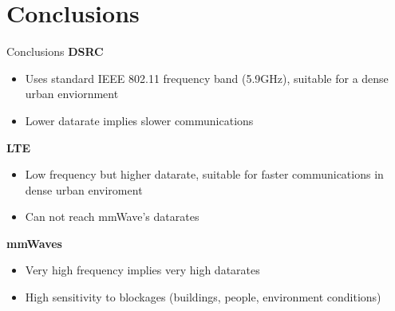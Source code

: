 \documentclass{beamer}
\begin{document}
	\section{Conclusions}
	\begin{frame}{Conclusions}
		\textbf{DSRC}
		\begin{itemize}
			\item Uses standard IEEE 802.11 frequency band (5.9GHz), suitable for a dense urban enviornment
			\item Lower datarate implies slower communications
		\end{itemize}
		\textbf{LTE}
		\begin{itemize}
			\item Low frequency but higher datarate, suitable for faster communications in dense urban enviroment
			\item Can not reach mmWave's datarates
		\end{itemize}
		\textbf{mmWaves}
		\begin{itemize}
			\item Very high frequency implies very high datarates
			\item High sensitivity to blockages (buildings, people, environment conditions)
		\end{itemize}
	\end{frame}
\end{document}

